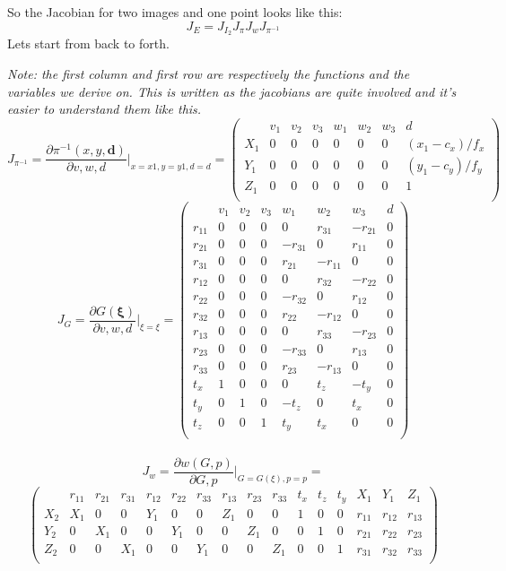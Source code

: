 \documentclass[a4paper,12pt]{article}
\begin{document}
So the Jacobian for two images and one point looks like this:
\[
J_E = J_{I_2}J_{\pi}J_{w}J_{\pi^{-1}}
\]
Lets start from back to forth. 
\par \emph{Note: the first column and first row are respectively the functions and the variables we derive on. This is written as the jacobians are quite involved and it's easier to understand them like this.}
\[
J_{\pi^{-1}} = \frac{\partial \pi^{-1}(x,y,\mathbf{d})}{\partial v, w, d } \biggr\rvert_{x=x1,y=y1,d=d} = 
\begin{pmatrix}  
& v_1 & v_2 & v_3 & w_1 & w_2 & w_3 & d\\ 
X_1 & 0 & 0 & 0 & 0 & 0 & 0 & (x_1-c_x)/f_x\\
Y_1 & 0 & 0 & 0 & 0 & 0 & 0 & (y_1-c_y)/f_y \\
Z_1 & 0 & 0 & 0 & 0 & 0 & 0 & 1 \\
\end{pmatrix}
\]
\[
J_{G} = \frac{\partial G( \boldsymbol{\xi} )}{\partial v, w, d } \biggr\rvert_{\xi = \xi } = 
\begin{pmatrix}  
& v_1 & v_2 & v_3 & w_1 & w_2 & w_3 & d\\ 
r_{11} & 0 & 0 & 0 & 0 & r_{31} & -r_{21} & 0 \\
r_{21} & 0 & 0 & 0 & -r_{31} & 0 & r_{11} & 0 \\
r_{31} & 0 & 0 & 0 & r_{21} & -r_{11} & 0 & 0 \\
r_{12} & 0 & 0 & 0 & 0 & r_{32} & -r_{22} & 0 \\
r_{22} & 0 & 0 & 0 & -r_{32} & 0 & r_{12} & 0 \\
r_{32} & 0 & 0 & 0 & r_{22} & -r_{12} & 0 & 0 \\
r_{13} & 0 & 0 & 0 & 0 & r_{33} & -r_{23} & 0 \\
r_{23} & 0 & 0 & 0 & -r_{33} & 0 & r_{13} & 0 \\
r_{33} & 0 & 0 & 0 & r_{23} & -r_{13} & 0 & 0 \\
t_x & 1 & 0 & 0 & 0 & t_z & -t_y & 0 \\
t_y & 0 & 1 & 0 & -t_z & 0 & t_x & 0 \\
t_z & 0 & 0 & 1 & t_y & t_x & 0 & 0 \\
\end{pmatrix}
\]
\\
\[
J_{w} = \frac{\partial w(G,p)}{\partial G,p } \biggr\rvert_{G=G(\xi), p = p} =
\]
\[
\begin{pmatrix}  
& r_{11} & r_{21} & r_{31} & r_{12} & r_{22} & r_{33} & r_{13} & r_{23} & r_{33} & t_x & t_z & t_y & X_1 & Y_1 & Z_1 \\ 
X_2 & X_1 & 0 & 0 & Y_1 & 0 & 0 & Z_1 & 0 & 0 & 1 & 0 & 0 & r_{11} & r_{12} & r_{13}\\
Y_2 & 0 & X_1 & 0 & 0 & Y_1 & 0 & 0 & Z_1 & 0 & 0 & 1 & 0 & r_{21} & r_{22} & r_{23}\\
Z_2 & 0 & 0 & X_1 & 0 & 0 & Y_1 & 0 & 0 & Z_1 & 0 & 0 & 1 & r_{31} & r_{32} & r_{33}\\
\end{pmatrix}
\]
\end{document}
